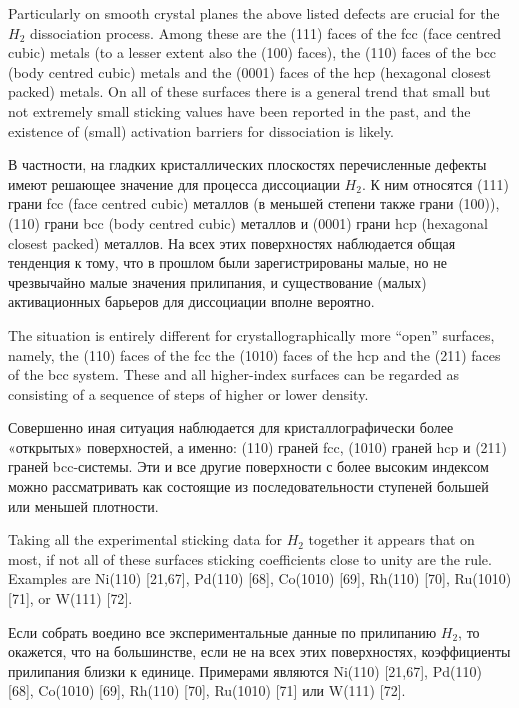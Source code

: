 \documentclass[11pt]{article}
\begin{document}
Particularly on smooth crystal planes the above listed defects are
crucial for the \(H_2\) dissociation process. Among these are the (111)
faces of the fcc (face centred cubic) metals (to a lesser extent also
the (100) faces), the (110) faces of the bcc (body centred cubic) metals
and the (0001) faces of the hcp (hexagonal closest packed) metals. On
all of these surfaces there is a general trend that small but not
extremely small sticking values have been reported in the past, and the
existence of (small) activation barriers for dissociation is likely.

В частности, на гладких кристаллических плоскостях перечисленные дефекты
имеют решающее значение для процесса диссоциации \(H_2\). К ним
относятся (111) грани fcc (face centred cubic) металлов (в меньшей
степени также грани (100)), (110) грани bcc (body centred cubic)
металлов и (0001) грани hcp (hexagonal closest packed) металлов. На всех
этих поверхностях наблюдается общая тенденция к тому, что в прошлом были
зарегистрированы малые, но не чрезвычайно малые значения прилипания, и
существование (малых) активационных барьеров для диссоциации вполне
вероятно.

The situation is entirely different for crystallographically more
``open'' surfaces, namely, the (110) faces of the fcc the (1010) faces
of the hcp and the (211) faces of the bcc system. These and all
higher-index surfaces can be regarded as consisting of a sequence of
steps of higher or lower density.

Совершенно иная ситуация наблюдается для кристаллографически более
«открытых» поверхностей, а именно: (110) граней fcc, (1010) граней hcp и
(211) граней bcc-системы. Эти и все другие поверхности с более высоким
индексом можно рассматривать как состоящие из последовательности
ступеней большей или меньшей плотности.

Taking all the experimental sticking data for \(H_2\) together it
appears that on most, if not all of these surfaces sticking coefficients
close to unity are the rule. Examples are Ni(110) {[}21,67{]}, Pd(110)
{[}68{]}, Co(1010) {[}69{]}, Rh(110) {[}70{]}, Ru(1010) {[}71{]}, or
W(111) {[}72{]}.

Если собрать воедино все экспериментальные данные по прилипанию \(H_2\),
то окажется, что на большинстве, если не на всех этих поверхностях,
коэффициенты прилипания близки к единице. Примерами являются Ni(110)
{[}21,67{]}, Pd(110) {[}68{]}, Co(1010) {[}69{]}, Rh(110) {[}70{]},
Ru(1010) {[}71{]} или W(111) {[}72{]}.
\end{document}

